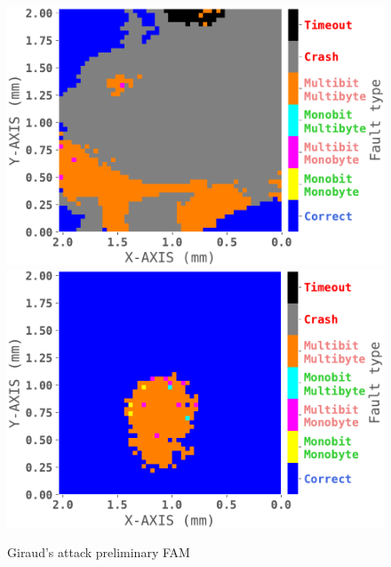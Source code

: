 
\begin{figure}[h]
	\centering
		\includegraphics[width=1.0\columnwidth]{./figures/aesFastGndOnly-cropped.pdf}
		\includegraphics[width=1.0\columnwidth]{./figures/aesFastImpGnd-cropped.pdf}
	\caption{Giraud's attack preliminary FAM}
	\label{giraud_fam}
\end{figure}
